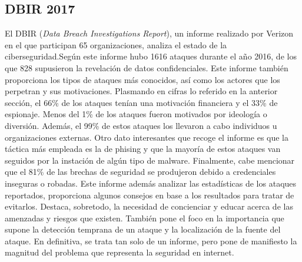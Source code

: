\subsection{DBIR 2017}
El DBIR (\textit{Data Breach Investigations Report}), un informe realizado por Verizon en el que participan 65 organizaciones, analiza el estado de la ciberseguridad.Según este informe hubo 1616 ataques durante el año 2016, de los que 828 supusieron la revelación de datos confidenciales. Este informe también proporciona los tipos de ataques más conocidos, así como los actores que los perpetran y sus motivaciones. Plasmando en cifras lo referido en la anterior sección, el 66\% de los ataques tenían una motivación financiera y el 33\% de espionaje. Menos del 1\% de los ataques fueron motivados por ideología o diversión. Además, el 99\% de estos ataques los llevaron a cabo individuos u organizaciones externas. Otro dato interesantes que recoge el informe es que la táctica más empleada es la de phising y que la mayoría de estos ataques van seguidos por la instación de algún tipo de malware. Finalmente, cabe mencionar que el 81\% de las brechas de seguridad se produjeron debido a credenciales inseguras o robadas. Este informe además analizar las estadísticas de los ataques reportados, proporciona algunos consejos en base a los resultados para tratar de evitarlos. Destaca, sobretodo, la necesidad de concienciar y educar acerca de las amenzadas y riesgos que existen. También pone el foco en la importancia que supone la detección temprana de un ataque y la localización de la fuente del ataque\cite{DBIR2017}. En definitiva, se trata tan solo de un informe, pero pone de manifiesto la magnitud del problema que representa la seguridad en internet.

